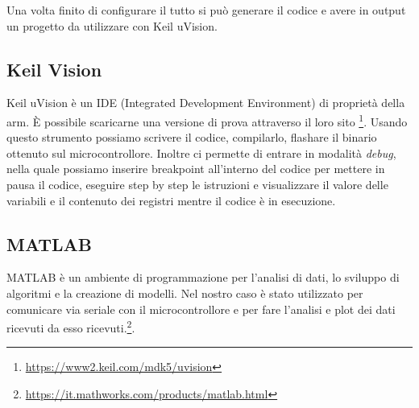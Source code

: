 Una volta finito di configurare il tutto si può generare il codice e avere in output un progetto da utilizzare con Keil uVision.

\subsection*{Keil Vision}
Keil uVision è un IDE (Integrated Development Environment) di proprietà della arm. È possibile scaricarne una versione di prova attraverso il loro sito \footnote{\href{https://www2.keil.com/mdk5/uvision}{https://www2.keil.com/mdk5/uvision}}.
Usando questo strumento possiamo scrivere il codice, compilarlo, flashare il binario ottenuto sul microcontrollore. Inoltre ci permette di entrare in modalità \textit{debug}, nella quale possiamo inserire breakpoint all'interno del codice per mettere in pausa il codice, eseguire step by step le istruzioni e visualizzare il valore delle variabili e il contenuto dei registri mentre il codice è in esecuzione.

\subsection*{MATLAB}
MATLAB è un ambiente di programmazione per l’analisi di dati, lo sviluppo di algoritmi e la creazione di modelli. 
Nel nostro caso è stato utilizzato per comunicare via seriale con il microcontrollore e per fare l'analisi e plot dei dati ricevuti da esso ricevuti.\footnote{\href{https://it.mathworks.com/products/matlab.html}{https://it.mathworks.com/products/matlab.html}}.